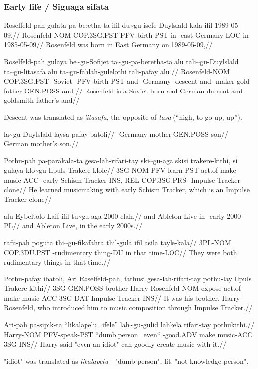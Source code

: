 \newpage

\subsubsection*{Early life / Siguaga sifata}
\ex
\begingl
\gla  Roselfeld-pah gulata      pa-beretha-ta ifil du\~{}gu-isefe Duylslald-kala ifil 1989-05-09.//
\glb  Rosenfeld-NOM COP.3SG.PST PFV-birth-PST  in   \agradj{}-east Germany-LOC    in   1985-05-09//
\glft Rosenfeld was born in East Germany on 1989-05-09,//
\endgl
\xe

\ex
\begingl
\gla  Roselfeld-pah gulaya      be\~{}gu-Sofijet ta\~{}gu-pa-beretha-ta alu tali\~{}gu-Duylslald ta\~{}gu-litasafa alu ta\~{}gu-fahlah-gulelothi tali-pafay      alu //
\glb  Rosenfeld-NOM COP.3SG.PST \agradj{}-Soviet \agradj{}-PFV-birth-PST and \agradj{}-Germany   \agradj{}-descent and \agradj{}-maker-gold      father-GEN.POSS and //
\glft Rosenfeld is a Soviet-born and German-descent and goldsmith father's and//
\endgl 
\xe


Descent was translated as \textit{litasafa}, the opposite of \textit{tasa} (``high, to go up, up'').

\ex
\begingl
\gla  la\~{}gu-Duylslald laysa-pafay batoli//
\glb  \agradj{}-Germany  mother-GEN.POSS son//
\glft German mother's son.//
\endgl
\xe

\ex
\begingl
\gla  Pothu-pah pa-parakala-ta gesa-lah-rifari-tay   ski\~{}gu-aga   skisi  trakere-kithi, si  gulaya      klo\~{}gu-Ilpuls  Trakere klole//
\glb  3SG-NOM   PFV-learn-PST  act.of-make-music-ACC \agradj{}-early Schism Tracker-INS,   REL COP.3SG.PRS \agradj{}-Impulse Tracker clone//
\glft He learned musicmaking with early Schism Tracker, which is an Impulse Tracker clone//
\endgl
\xe

\ex
\begingl
\gla  alu Eybeltolo Laif ifil tu\~{}gu-aga    2000-elah.//
\glb  and Ableton   Live in   \agradj{}-early 2000-PL//
\glft and Ableton Live, in the early 2000s.//
\endgl
\xe

\ex
\begingl
\gla  rafu-pah poguta      thi\~{}gu-fikafahra   thil-gula ifil asila tayle-kala//
\glb  3PL-NOM  COP.3DU.PST \agradj{}-rudimentary thing-DU  in   that  time-LOC//
\glft They were both rudimentary things in that time.//
\endgl
\xe

\ex
\begingl
\gla  Pothu-pafay  ibatoli, Ari   Roselfeld-pah, fathusi gesa-lah-rifari-tay   pothu-lay Ilpuls  Trakere-kithi//
\glb  3SG-GEN.POSS brother  Harry Rosenfeld-NOM  expose  act.of-make-music-ACC 3SG-DAT   Impulse Tracker-INS//
\glft It was his brother, Harry Rosenfeld, who introduced him to music composition through Impulse Tracker.//
\endgl
\xe

\ex
\begingl
\gla  Ari-pah   pa-sipik-ta   ``likalapelu=ifele'' lah\~{}gu-gulid    lahkela rifari-tay pothukithi.//
\glb  Harry-NOM PFV-speak-PST ``dumb.person=even`` \agradj{}-good.ADV make    music-ACC  3SG-INS//
\glft Harry said "even an idiot" can goodly create music with it.//
\endgl
\xe

"idiot" was translated as \textit{likalapelu} - "dumb person", lit. "not-knowledge person".
